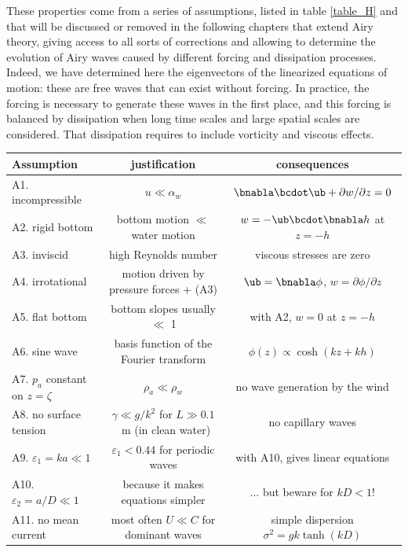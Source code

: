 These properties come from a series of assumptions, listed in table \ref{table_H} and that will be discussed or removed in 
the following chapters that extend Airy theory, giving access to all sorts of corrections and allowing to determine the 
evolution of Airy waves caused by different forcing and dissipation processes. Indeed, we have determined here the 
eigenvectors of the linearized equations of motion: these are free waves that can exist without forcing. In practice, the forcing 
is necessary to generate these waves in the first place, and this forcing is balanced by dissipation when long time scales and large 
spatial scales are considered. That dissipation requires to include vorticity and viscous effects. 
\begin{table}
  \centering
  \begin{tabular}{lcc}
\hline
 Assumption          & justification                                  & consequences  \\
\hline
 A1. incompressible &   $u \ll \alpha_w $             & $\bnabla \bcdot \ub + \partial w/\partial z=0$ \\
 A2. rigid bottom   & bottom motion $\ll$ water motion & $w=-\ub \bcdot \bnabla h$ at $z=-h$ \\
 A3. inviscid       & high Reynolds number                    & viscous stresses are zero \\
 A4. irrotational   & motion driven by pressure forces + (A3)   & $\ub=\bnabla \phi$, $w=\partial \phi/\partial z$\\
 A5. flat bottom    & bottom slopes usually $\ll$ 1 & with A2, $w=0$ at $z=-h$ \\
 A6. sine wave      & basis function of the Fourier transform & $\phi(z) \propto
 \cosh(kz+kh)$ \\
 A7. $p_a$ constant on $z=\zeta$ & $\rho_a \ll \rho_w$         &  no wave generation by the wind \\
 A8. no surface tension & $\gamma \ll g/k^2$ for $L \gg 0.1$~m (in clean water) & no capillary waves \\
 A9. $\varepsilon_1=ka \ll 1$ & $\varepsilon_1 <0.44$ for periodic waves & with A10, gives linear equations \\
 A10. $\varepsilon_2=a/D \ll 1$ & because it makes equations simpler & ... but beware for  $kD < 1$! \\
 A11. no mean current & most often $U \ll C$  for dominant waves & simple dispersion  $\sigma^2 = gk \tanh(kD)$ \\

\end{tabular}
\end{table}
